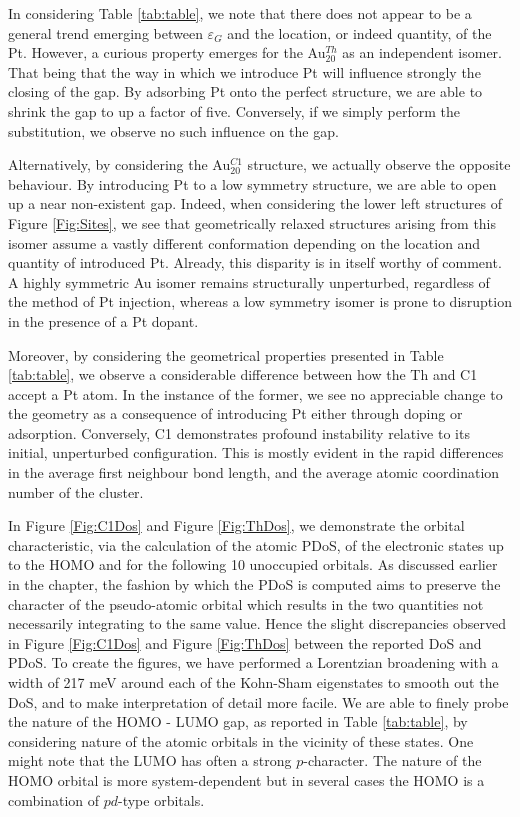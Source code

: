 In considering Table \ref{tab:table}, we note that there does not appear to be a general trend emerging between $\varepsilon_G$ and the location, or indeed quantity, of the Pt. However, a curious property emerges for the Au$^{Th}_{20}$ as an independent isomer. That being that the way in which we introduce Pt will influence strongly the closing of the gap. By adsorbing Pt onto the perfect structure, we are able to shrink the gap to up a factor of five. Conversely, if we simply perform the substitution, we observe no such influence on the gap.

Alternatively, by considering the Au$^{C1}_{20}$ structure, we actually observe the opposite behaviour. By introducing Pt to a low symmetry structure, we are able to open up a near non-existent gap. Indeed, when considering the lower left structures of Figure \ref{Fig:Sites}, we see that geometrically relaxed structures arising from this isomer assume a vastly different conformation depending on the location and quantity of introduced Pt. Already, this disparity is in itself worthy of comment. A highly symmetric Au isomer remains structurally unperturbed, regardless of the method of Pt injection, whereas a low symmetry isomer is  prone to disruption in the presence of a Pt dopant.

Moreover, by considering the geometrical properties presented in Table \ref{tab:table}, we observe a considerable difference between how the Th and C1 accept a Pt atom. In the instance of the former, we see no appreciable change to the geometry as a consequence of introducing Pt either through doping or adsorption. Conversely, C1 demonstrates profound instability relative to its initial, unperturbed configuration. This is mostly evident in the rapid differences in the average first neighbour bond length, and the average atomic coordination number of the cluster.

In Figure \ref{Fig:C1Dos} and Figure \ref{Fig:ThDos}, we demonstrate the orbital characteristic, via the calculation of the atomic PDoS, of the electronic states up to the HOMO and for the following 10 unoccupied orbitals. As discussed earlier in the chapter, the fashion by which the PDoS is computed aims to preserve the character of the pseudo-atomic orbital which results in the two quantities not necessarily integrating to the same value. Hence the slight discrepancies observed in Figure \ref{Fig:C1Dos} and Figure \ref{Fig:ThDos} between the reported DoS and PDoS. To create the figures, we have performed a Lorentzian broadening with a width of 217 meV around each of the Kohn-Sham eigenstates to smooth out the DoS, and to make interpretation of detail more facile. We are able to finely probe the nature of the HOMO - LUMO gap, as reported in Table \ref{tab:table}, by considering nature of the atomic orbitals in the vicinity of these states. One might note that the LUMO has often a strong $p$-character. The nature of the HOMO orbital is more system-dependent but in several cases the HOMO is a combination of $pd$-type orbitals. 


